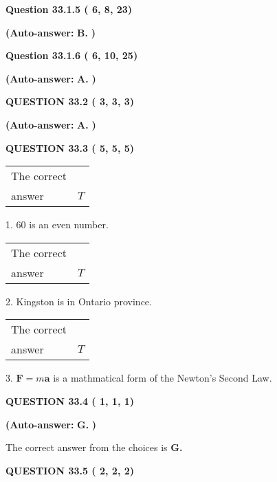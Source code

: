 \documentclass[12pt]{article}
\begin{document}
 
  
  
{\textbf{\large{Question
33.1.5 
 (          6,          8,         23)
}}}
 
 
{\textbf{(Auto-answer:}}
{\textbf{\large{
B.}}}
{\textbf{)}}
 
 
  
  
{\textbf{\large{Question
33.1.6 
 (          6,         10,         25)
}}}
 
 
{\textbf{(Auto-answer:}}
{\textbf{\large{
A.}}}
{\textbf{)}}
 
 
  
  
{\textbf{\large{QUESTION
33.2 
 (          3,          3,          3)
}}}
 
 
{\textbf{(Auto-answer:}}
{\textbf{\large{
A.}}}
{\textbf{)}}
 
 
  
  
{\textbf{\large{QUESTION
33.3 
 (          5,          5,          5)
}}}

 
\noindent\begin{tabular}{|l|l|}\hline The correct & \\
          answer &  %
$T$ \\ \hline \end{tabular}
1. $ %
60$ is an  %
even number.
 
\noindent\begin{tabular}{|l|l|}\hline The correct & \\
          answer &  %
$T$ \\ \hline \end{tabular}
2.  %
Kingston is in  %
Ontario province.
 
\noindent\begin{tabular}{|l|l|}\hline The correct & \\
          answer &  %
$T$ \\ \hline \end{tabular}
3.  %
$\mathbf{F}=m\mathbf{a}$ is a mathmatical form of  %
the Newton's Second Law.
 
  
  
{\textbf{\large{QUESTION
33.4 
 (          1,          1,          1)
}}}
 
 
{\textbf{(Auto-answer:}}
{\textbf{\large{
G.}}}
{\textbf{)}}
 
 

The correct answer from the choices is
{\textbf{\large{
G.}}}
 
  
  
{\textbf{\large{QUESTION
33.5 
 (          2,          2,          2)
}}}
 
\end{document}
